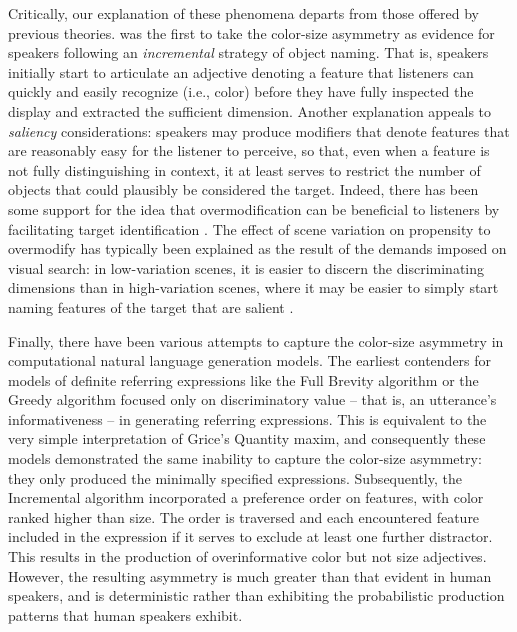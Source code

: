 \documentclass[11pt]{article}
\begin{document}
Critically, our explanation of these phenomena departs from those offered by previous theories. 
 was the first to take the color-size asymmetry as evidence for speakers following an \emph{incremental} strategy of object naming.
That is, speakers initially start to articulate an adjective denoting a feature that listeners can quickly and easily recognize (i.e., color) before they have fully inspected the display and extracted the sufficient dimension. 
Another explanation appeals to \emph{saliency} considerations: speakers may produce modifiers that denote features that are reasonably easy for the listener to perceive, so that, even when a feature is not fully distinguishing in context, it at least serves to restrict the number of objects that could plausibly be considered the target. Indeed, there has been some support for the idea that overmodification can be beneficial to listeners by facilitating target identification \cite{Arts2011, rubiofernandez2016, Paraboni2007}. 
The effect of scene variation on propensity to overmodify has typically been explained as the result of the demands imposed on visual search: in low-variation scenes, it is easier to discern the discriminating dimensions than in high-variation scenes, where it may be easier to simply start naming features of the target that are salient \cite{Koolen2013}. 

Finally, there have been various attempts to capture the color-size asymmetry in computational natural language generation models. The earliest contenders for models of definite referring expressions like the Full Brevity algorithm \cite{Dale1989} or the Greedy algorithm \cite{Dale1989} focused only on discriminatory value -- that is, an utterance's informativeness -- in generating referring expressions. This is equivalent to the very simple interpretation of Grice's Quantity maxim, and consequently these models demonstrated the same inability to capture the color-size asymmetry: they only produced the minimally specified expressions. Subsequently, the Incremental algorithm \cite{dale1995} incorporated a preference order on features, with color ranked higher than size. The order is traversed and each encountered feature included in the expression if it serves to exclude at least one further distractor. This results in the production of overinformative color but not size adjectives. However, the resulting asymmetry is much greater than that evident in human speakers, and is deterministic rather than exhibiting the probabilistic production patterns that human speakers exhibit. 
\end{document}
